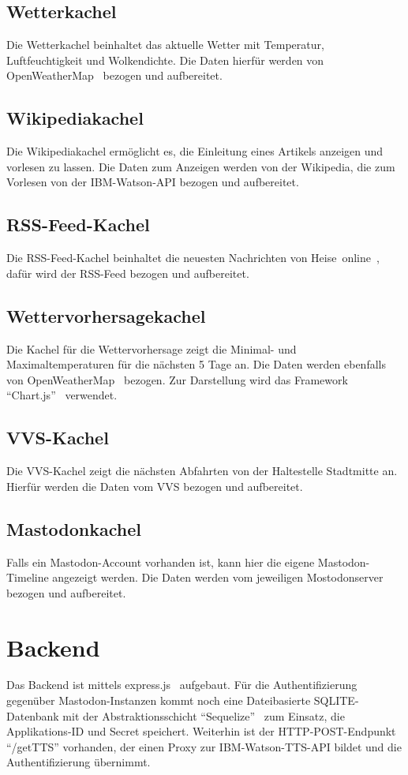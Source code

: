 \documentclass[fleqn,10pt]{SelfArx} %
\begin{document}
\subsection{Wetterkachel}
Die Wetterkachel beinhaltet das aktuelle Wetter mit Temperatur, Luftfeuchtigkeit und Wolkendichte. Die Daten hierfür werden von OpenWeatherMap~\cite{owm} bezogen und aufbereitet.
\subsection{Wikipediakachel}
Die Wikipediakachel ermöglicht es, die Einleitung eines Artikels anzeigen und vorlesen zu lassen. Die Daten zum Anzeigen werden von der Wikipedia, die zum Vorlesen von der IBM-Watson-API bezogen und aufbereitet.
\subsection{RSS-Feed-Kachel}
Die RSS-Feed-Kachel beinhaltet die neuesten Nachrichten von Heise~online~\cite{heise}, dafür wird der RSS-Feed bezogen und aufbereitet.
\subsection{Wettervorhersagekachel}
Die Kachel für die Wettervorhersage zeigt die Minimal- und Maximaltemperaturen für die nächsten 5 Tage an. Die Daten werden ebenfalls von OpenWeatherMap~\cite{owm} bezogen. Zur Darstellung wird das Framework \enquote{Chart.js}~\cite{chartjs} verwendet.
\subsection{VVS-Kachel}
Die VVS-Kachel zeigt die nächsten Abfahrten von der Haltestelle Stadtmitte an. Hierfür werden die Daten vom VVS bezogen und aufbereitet.
\subsection{Mastodonkachel}
Falls ein Mastodon-Account vorhanden ist, kann hier die eigene Mastodon-Timeline angezeigt werden. Die Daten werden vom jeweiligen Mostodonserver bezogen und aufbereitet.
\section{Backend}
Das Backend ist mittels express.js~\cite{express} aufgebaut. Für die Authentifizierung gegenüber Mastodon-Instanzen kommt noch eine Dateibasierte SQLITE-Datenbank mit der Abstraktionsschicht \enquote{Sequelize}~\cite{sequelize} zum Einsatz, die Applikations-ID und Secret speichert. Weiterhin ist der HTTP-POST-Endpunkt \enquote{/getTTS} vorhanden, der einen Proxy zur IBM-Watson-TTS-API bildet und die Authentifizierung übernimmt.
\end{document}
